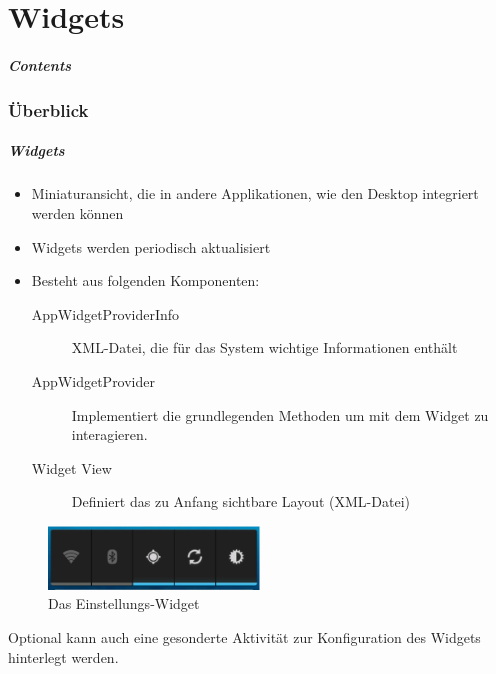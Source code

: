 \part{Widgets}
\frame{\partpage}
\begin{frame}
	\frametitle{Contents}
	\tableofcontents[
		pausesections,
	]
\end{frame}

\section{Überblick}
\begin{frame}[label=widgets]
   \frametitle{Widgets}
   \begin{itemize}
      \item Miniaturansicht, die in andere Applikationen, wie den Desktop integriert werden können
      \item Widgets werden periodisch aktualisiert
      \item Besteht aus folgenden Komponenten:
         \begin{description}
            \item[AppWidgetProviderInfo] XML-Datei, die für das System wichtige Informationen enthält
            \item[AppWidgetProvider] Implementiert die grundlegenden Methoden 
               um mit dem Widget zu interagieren.
            \item[Widget View] Definiert das zu Anfang sichtbare Layout (XML-Datei)
         \end{description}
   \end{itemize}

   \begin{figure}[h!]
      \centering
      \includegraphics[width=0.5\textwidth]{pictures/widget.eps}
      \caption{Das Einstellungs-Widget}
      \label{fig:widget}
   \end{figure}

   Optional kann auch eine gesonderte Aktivität zur Konfiguration des 
   Widgets hinterlegt werden.
\end{frame}

